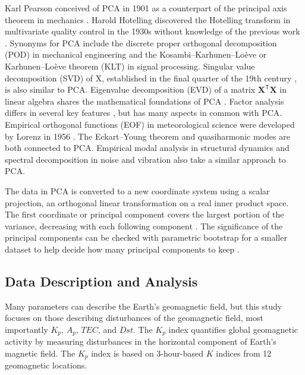 \documentclass[sn-mathphys-num]{sn-jnl}%
\begin{document}
Karl Pearson \cite{pearson1901liii} conceived of PCA in 1901 as a counterpart of the principal axis theorem in mechanics \cite{stewart2019introduction}. Harold Hotelling discovered the Hotelling transform in multivariate quality control in the 1930s without knowledge of the previous work \cite{hotelling1933analysis, hotelling1992relations}. Synonyms for PCA include the discrete proper orthogonal decomposition (POD) \cite{berkooz1993proper, karhunen1946spektraltheorie, loeve1977elementary, sirovich1987turbulence} in mechanical engineering and the Kosambi–Karhunen–Loève or Karhunen–Loève theorem (KLT) \cite{sapatnekar2011overcoming, ghoman2012pod, archiveKarhunenLoeveTransform, giambartolomei2016, mallat1999wavelet, tang1998texture} in signal processing. Singular value decomposition (SVD) of X, established in the final quarter of the 19th century \cite{stewart1993early}, is also similar to PCA. Eigenvalue decomposition (EVD) of a matrix $\mathbf{X}^{\mathsf{T}}\mathbf{X}$ in linear algebra shares the mathematical foundations of PCA \cite{gloub1996matrix, hayden2002observations}. Factor analysis differs in several key features \cite{jolliffe2002principal}, but has many aspects in common with PCA. Empirical orthogonal functions (EOF) \cite{lorenz1956empirical} in meteorological science were developed by Lorenz in 1956 \cite{lorenz1956empirical}. The Eckart–Young theorem \cite{eckart1936approximation} and quasiharmonic modes \cite{dove1993introduction} are both connected to PCA. Empirical modal analysis in structural dynamics and spectral decomposition in noise and vibration also take a similar approach to PCA.

The data in PCA is converted to a new coordinate system using a scalar projection, an orthogonal linear transformation on a real inner product space. The first coordinate or principal component covers the largest portion of the variance, decreasing with each following component \cite{jolliffe2002principal, bengio2013representation}. The significance of the principal components can be checked with parametric bootstrap for a smaller dataset to help decide how many principal components to keep \cite{forkman2019hypothesis}.

\subsection{Data Description and Analysis}

Many parameters can describe the Earth's geomagnetic field, but this study focuses on those describing disturbances of the geomagnetic field, most importantly $K_p$, $A_p$, $TEC$, and $Dst$. The $K_p$ index quantifies global geomagnetic activity by measuring disturbances in the horizontal component of Earth's magnetic field. The $K_p$ index is based on 3-hour-based $K$ indices from 12 geomagnetic locations.
\end{document}
